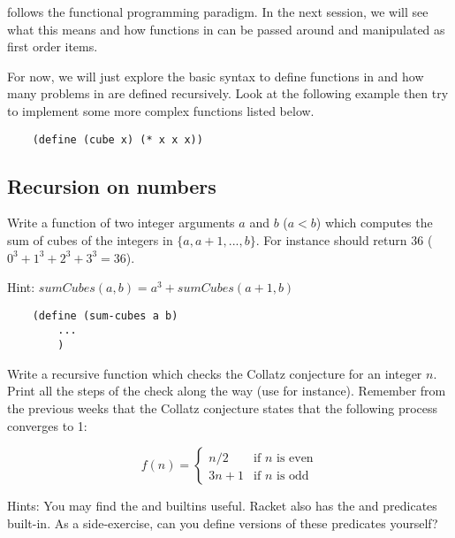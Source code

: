 \documentclass{../../../tp}
\begin{document}
\scheme follows the functional programming paradigm. In the next session, we will see what this means and how functions in \scheme can be passed around and manipulated as first order items.

For now, we will just explore the basic syntax to define functions in \scheme and how many problems in \scheme are defined recursively. Look at the following example then try to implement some more complex functions listed below.

\begin{verbatim}
	(define (cube x) (* x x x))
\end{verbatim}




\subsection{Recursion on numbers}

\begin{instruction}
	Write a function  of two integer arguments $a$ and $b$ ($a < b$) which computes the sum of cubes of the integers in $\{a, a+1, ...,  b\}$. For instance  should return 36 ($0^3 + 1^3 + 2^3 + 3^3 = 36$).
	
	Hint: $sumCubes(a,b) = a^3 + sumCubes(a+1, b)$
	
	\begin{verbatim}
	(define (sum-cubes a b) 
		... 
		)
	\end{verbatim}
\end{instruction}



\begin{instruction}	
	
	Write a recursive function  which checks the Collatz conjecture for an integer $n$. Print all the steps of the check along the way (use   for instance). Remember from the previous weeks that the Collatz conjecture states that the following process converges to 1:
	
		\begin{equation*}
		f(n) = 
		\begin{cases}
		n/2 & \text{if $n$ is even} \\
		3n + 1 & \text{if $n$ is odd} 
		\end{cases}
		\end{equation*}
	
	Hints: You may find the  and  builtins useful. Racket also has the   and  predicates built-in. As a side-exercise, can you define versions of these predicates yourself?
\end{instruction}
\end{document}
